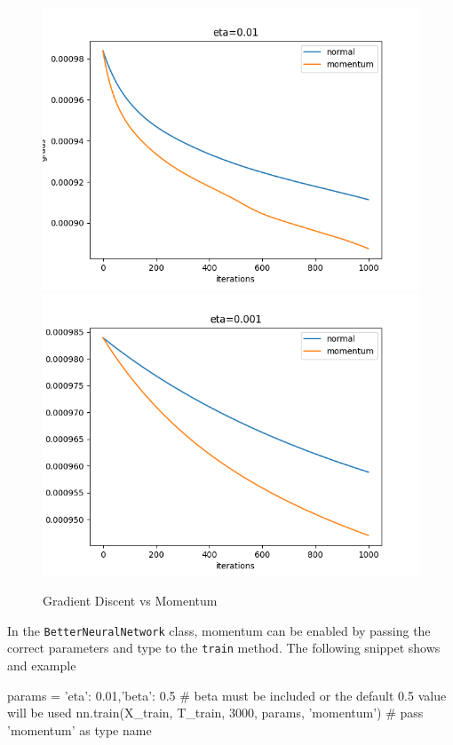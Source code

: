 \documentclass[11pt]{article}
\begin{document}
\begin{figure}[H]
\includegraphics[scale=0.5]{images/momentum/momentum_plot_2.png}	
\includegraphics[scale=0.5]{images/momentum/momentum_plot_3.png}	
\caption{Gradient Discent vs Momentum}
\label{fig:momentum}

\end{figure}
In the \texttt{BetterNeuralNetwork} class, momentum can be enabled by passing the correct parameters and type to the \texttt{train} method. The following snippet shows and example

\begin{python}
params = {'eta': 0.01,'beta': 0.5} # beta must be included or the default 0.5 value will be used
nn.train(X_train, T_train, 3000, params, 'momentum')	 # pass 'momentum' as type name
\end{python}
\end{document}
